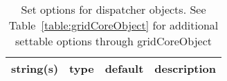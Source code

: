 \begin{table}[ht]
\centering
\begin{tabular}{p{5cm} c c p{7cm}}
\hline
string(s) & type & default & description \\
\hline
\hline
\end{tabular}
\caption{Set options for dispatcher objects. See Table~\ref{table:gridCoreObject} for additional settable options through gridCoreObject}
\label{table:dispatcher}
\end{table}
